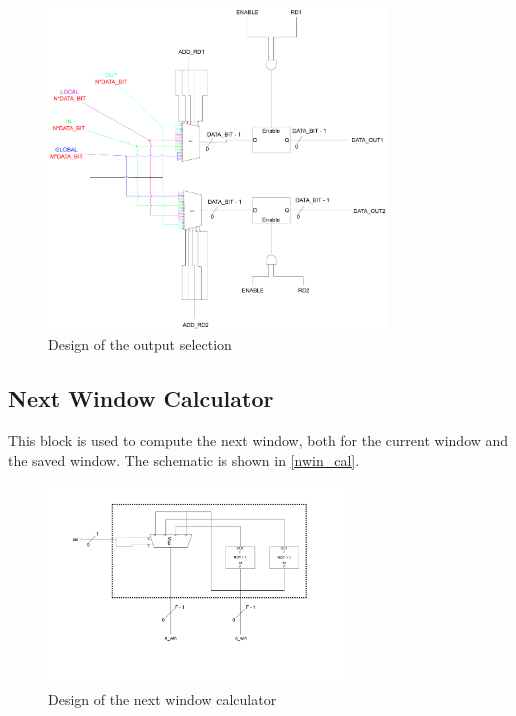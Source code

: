 \begin{figure}[H]
  \centering
  \includegraphics[width=0.8\textwidth]{chapters/4_DecodeStage/images/output_choice.pdf}
  \caption{Design of the output selection}
  \label{output_choice}
\end{figure}


\subsection{Next Window Calculator}

This block is used to compute the next window, both for the current window and the saved window. The schematic is shown in \autoref{nwin_cal}.

\begin{figure}[H]
  \centering
  \includegraphics[width=0.7\textwidth]{chapters/4_DecodeStage/images/nwin_cal.pdf}
  \caption{Design of the next window calculator}
  \label{nwin_cal}
\end{figure}

